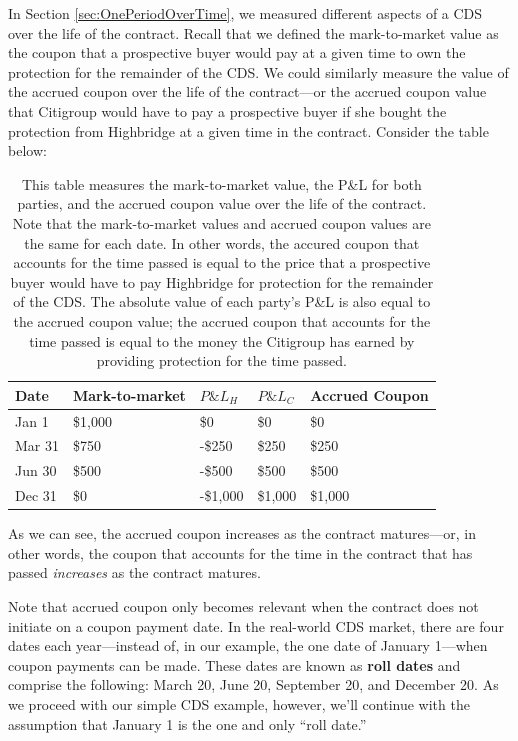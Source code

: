 \documentclass{jss}
\begin{document}
In Section \ref{sec:OnePeriodOverTime}, we measured different aspects of a CDS over the life of the contract. Recall that we defined the mark-to-market value as the coupon that a prospective buyer would pay at a given time to own the protection for the remainder of the CDS. We could similarly measure the value of the accrued coupon over the life of the contract---or the accrued coupon value that Citigroup would have to pay a prospective buyer if she bought the protection from Highbridge at a given time in the contract. Consider the table below:

\begin{table}[H]
\centering
{\footnotesize
\begin{tabular}{lllll}
  \hline
Date & Mark-to-market & $P\&L_H$ & $P\&L_C$ & Accrued Coupon \\ 
  \hline
  Jan 1 & \$1,000 & \$0 & \$0 & \$0\\ 
  Mar 31 & \$750 & -\$250 & \$250 & \$250\\ 
  Jun 30 & \$500 & -\$500 & \$500 & \$500\\ 
  Dec 31 & \$0 & -\$1,000 & \$1,000 & \$1,000\\
   \hline
\end{tabular}
}
\caption{This table measures the mark-to-market value, the P\&L for both parties, and the accrued coupon value over the life of the contract. Note that the mark-to-market values and accrued coupon values are the same for each date. In other words, the accured coupon that accounts for the time passed is equal to the price that a prospective buyer would have to pay Highbridge for protection for the remainder of the CDS. The absolute value of each party's P\&L is also equal to the accrued coupon value; the accrued coupon that accounts for the time passed is equal to the money the Citigroup has earned by providing protection for the time passed.}
\end{table}

As we can see, the accrued coupon increases as the contract matures---or, in other words, the coupon that accounts for the time in the contract that has passed \emph{increases} as the contract matures.

Note that accrued coupon only becomes relevant when the contract does not initiate on a coupon payment date. In the real-world CDS market, there are four dates each year---instead of, in our example, the one date of January 1---when coupon payments can be made. These dates are known as \textbf{roll dates} and comprise the following: March 20, June 20, September 20, and December 20. As we proceed with our simple CDS example, however, we'll continue with the assumption that January 1 is the one and only ``roll date.''  
\end{document}
